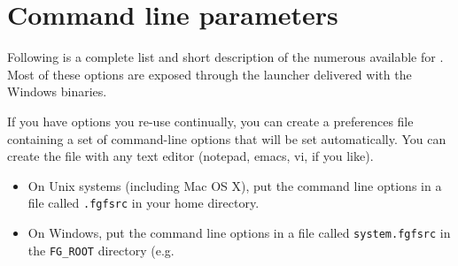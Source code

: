 {

  \section{Command line parameters\label{options}}
  Following is a complete list and short description of the numerous 
  available for \FlightGear{}. Most of these options are exposed through the \FlightGear{} launcher delivered with the
  Windows binaries.

  If you have options you re-use continually, you can create a preferences file
  containing a set of command-line options that will be set automatically. You
  can create the file with any text editor (notepad, emacs, vi, if you like).

  \begin{itemize}
  \item On Unix systems (including Mac OS X), put the command line options in a
  file called \texttt{.fgfsrc} in your home directory.

  \item On Windows, put the command line options in a file called \texttt{system.fgfsrc}
   in the \texttt{FG\_ROOT} directory (e.g.
  \end{itemize}
}


